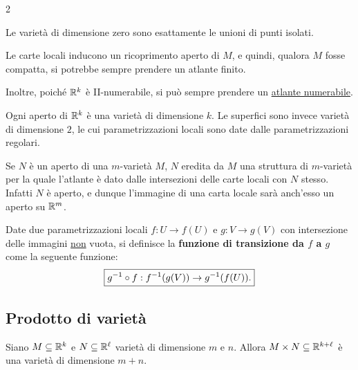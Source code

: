 \begin{multicols*}{2}
    \begin{remark}
        Le varietà di dimensione zero sono esattamente le unioni di punti isolati.
    \end{remark}

    \begin{remark}
        Le carte locali inducono un ricoprimento aperto di $M$, e quindi, qualora $M$ fosse compatta, si potrebbe
        sempre prendere un atlante finito. \smallskip

        Inoltre, poiché $\mathbb{R}^k$ è II-numerabile, si può sempre prendere un \underline{atlante numerabile}.
    \end{remark}

    \begin{remark}
        Ogni aperto di $\mathbb{R}^k$ è una varietà di dimensione $k$. Le superfici sono invece varietà
        di dimensione $2$, le cui parametrizzazioni locali sono date dalle parametrizzazioni
        regolari.
    \end{remark}

    \begin{remark} \label{rmk:aperti_di_varietà_sono_varietà}
        Se $N$ è un aperto di una $m$-varietà $M$, $N$ eredita da $M$ una
        struttura di $m$-varietà per la quale l'atlante è dato dalle intersezioni
        delle carte locali con $N$ stesso. Infatti $N$ è aperto, e dunque
        l'immagine di una carta locale sarà anch'esso un aperto su $\mathbb{R}^m$.
    \end{remark}

    \begin{definition}
        Date due parametrizzazioni locali $f : U \to f(U)$ e $g : V \to g(V)$ con intersezione
        delle immagini \underline{non} vuota, si
        definisce la \textbf{funzione di transizione da $f$ a $g$} come la seguente funzione:
        \[ \boxed{g^{-1} \circ f : f^{-1}(g(V)) \to g^{-1}(f(U)).} \]
    \end{definition}

    \subsection{Prodotto di varietà}

    \begin{proposition} \label{prop:prodotto_varietà}
        Siano $M \subseteq \mathbb{R}^k$ e $N \subseteq \mathbb{R}^\ell$ varietà di dimensione
        $m$ e $n$. Allora $M \times N \subseteq \mathbb{R}^{k+\ell}$ è una varietà
        di dimensione $m + n$. \smallskip


\end{proposition}
\end{multicols*}
